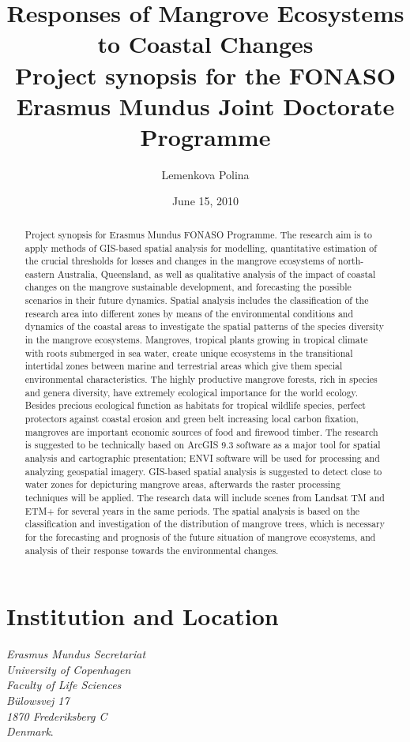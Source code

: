 \documentclass[11pt]{paper}
\title{%
  Responses of Mangrove Ecosystems to Coastal Changes
 \\ \vspace{1em}
  \large Project synopsis for the FONASO Erasmus Mundus Joint Doctorate Programme}
\author{Lemenkova Polina}
\date{June 15, 2010}
\begin{document}
\maketitle

\begin{abstract}
Project synopsis for Erasmus Mundus FONASO Programme. The research aim is to apply methods of GIS-based spatial analysis for modelling, quantitative estimation of the crucial thresholds for losses and changes in the mangrove ecosystems of north-eastern Australia, Queensland, as well as qualitative analysis of the impact of coastal changes on the mangrove sustainable development, and forecasting the possible scenarios in their future dynamics. Spatial analysis includes the classification of the research area into different zones by means of the environmental conditions and dynamics of the coastal areas to investigate the spatial patterns of the species diversity in the mangrove ecosystems. Mangroves, tropical plants growing in tropical climate with roots submerged in sea water, create unique ecosystems in the transitional intertidal zones between marine and terrestrial areas which give them special environmental characteristics. The highly productive mangrove forests, rich in species and genera diversity, have extremely ecological importance for the world ecology. Besides precious ecological function as habitats for tropical wildlife species, perfect protectors against coastal erosion and green belt increasing local carbon fixation, mangroves are important economic sources of food and firewood timber. The research is suggested to be technically based on ArcGIS 9.3 software as a major tool for spatial analysis and cartographic presentation; ENVI software will be used for processing and analyzing geospatial imagery. GIS-based spatial analysis is suggested to detect close to water zones for depicturing mangrove areas, afterwards the raster processing techniques will be applied. The research data will include scenes from Landsat TM and ETM+ for several years in the same periods. The spatial analysis is based on the classification and investigation of the distribution of mangrove trees, which is necessary for the forecasting and prognosis of the future situation of mangrove ecosystems, and analysis of their response towards the environmental changes.\end{abstract}

\section{Institution and Location}
\emph{Erasmus Mundus Secretariat\\
University of Copenhagen\\
Faculty of Life Sciences\\
Bülowsvej 17\\
1870 Frederiksberg C\\
Denmark}.
\end{document}
